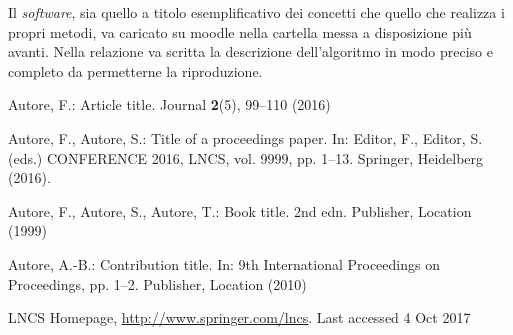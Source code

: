 \documentclass[runningheads]{llncs}
\begin{document}
Il \textit{software}, sia quello a titolo esemplificativo dei concetti
che quello che realizza i propri metodi, va caricato su moodle nella
cartella messa a disposizione pi\`u avanti.  Nella relazione va
scritta la descrizione dell'algoritmo in modo preciso e completo da
permetterne la riproduzione.

\begin{thebibliography}{8}
Autore, F.: Article title. Journal \textbf{2}(5), 99--110 (2016)

Autore, F., Autore, S.: Title of a proceedings paper. In: Editor,
F., Editor, S. (eds.) CONFERENCE 2016, LNCS, vol. 9999, pp. 1--13.
Springer, Heidelberg (2016). 

Autore, F., Autore, S., Autore, T.: Book title. 2nd edn. Publisher,
Location (1999)

Autore, A.-B.: Contribution title. In: 9th International Proceedings
on Proceedings, pp. 1--2. Publisher, Location (2010)

LNCS Homepage, \url{http://www.springer.com/lncs}. Last accessed 4
Oct 2017
\end{thebibliography}

\begin{figure}[h!]
\end{figure}
\end{document}
